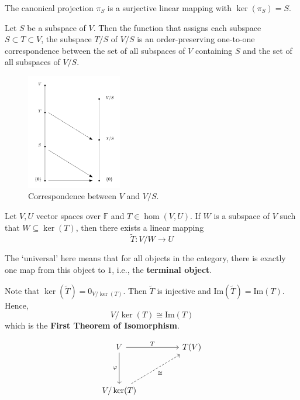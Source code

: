 \begin{theorem}
	The canonical projection $\pi_S$ is a surjective linear mapping with $\ker (\pi_S) = S$.
\end{theorem}

\begin{theorem}
	Let $S$ be a subspace of $V$. Then the function that assigns each subspace $S \subset T \subset V$, the subspace $T/S$ of $V/S$ is an order-preserving one-to-one correspondence between the set of all subspaces of $V$ containing $S$ and the set of all subspaces of $V/S$.
\end{theorem}

\begin{figure}[h]
	\centering
	  \includegraphics[width=0.37\textwidth]{Figures/correspondence_theorem.png} 
	  \caption{Correspondence between $V$ and $V/S$.}
	  \label{fig:correspondence-theorem}
\end{figure}

\begin{theorem}
	Let $V, U$ vector spaces over $\mathbb{F}$ and $T \in \hom(V, U)$. If $W$ is a subspace of $V$ such that $W \subseteq \ker (T)$, then there exists a linear mapping 
	\[
		\tilde{T} : V / W \longrightarrow U
	\]
\end{theorem}

The `universal' here means that for all objects in the category, there is exactly one map from this object to $\mathfrak{1}$, i.e., the \textbf{terminal object}.

Note that $\ker (\tilde{T}) = 0_{V/\ker (T)}$. Then $\tilde{T}$ is injective and $\text{Im}(\tilde{T}) = \text{Im}(T)$. Hence,
\[
	V/\ker (T) \cong \text{Im}(T)
\]
which is the \textbf{First Theorem of Isomorphism}.

\[\begin{tikzcd}
	V && {T(V)} \\
	\\
	{V/\ker(T)}
	\arrow["T", from=1-1, to=1-3]
	\arrow["\varphi"', from=1-1, to=3-1]
	\arrow["\cong"', dashed, from=3-1, to=1-3]
\end{tikzcd}\]

